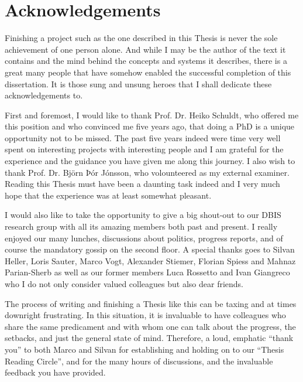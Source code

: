 
\chapter{Acknowledgements}

Finishing a project such as the one described in this Thesis is never the sole achievement of one person alone. And while I may be the author of the text it contains and the mind behind the concepts and systems it describes, there is a great many people that have somehow enabled the successful completion of this dissertation. It is those sung and unsung heroes that I shall dedicate these acknowledgements to.

First and foremost, I would like to thank Prof. Dr. Heiko Schuldt, who offered me this position and who convinced me five years ago, that doing a PhD is a unique opportunity not to be missed. The past five years indeed were time very well spent on interesting projects with interesting people and I am grateful for the experience and the guidance you have given me along this journey. I also wish to thank Prof. Dr. Björn Þór Jónsson, who volounteered as my external examiner. Reading this Thesis must have been a daunting task indeed and I very much hope that the experience was at least somewhat pleasant.

I would also like to take the opportunity to give a big shout-out to our DBIS research group with all its amazing members both past and present. I really enjoyed our many lunches, discussions about politics, progress reports, and of course the mandatory gossip on the second floor. A special thanks goes to Silvan Heller, Loris Sauter, Marco Vogt, Alexander Stiemer, Florian Spiess and Mahnaz Parian-Sherb as well as our former members Luca Rossetto and Ivan Giangreco who I do not only consider valued colleagues but also dear friends.  

The process of writing and finishing a Thesis like this can be taxing and at times downright frustrating. In this situation, it is invaluable to have colleagues who share the same predicament and with whom one can talk about the progress, the setbacks, and just the general state of mind. Therefore, a loud, emphatic ``thank you'' to both Marco and Silvan for establishing and holding on to our ``Thesis Reading Circle'', and for the many hours of discussions, and the invaluable feedback you have provided.


